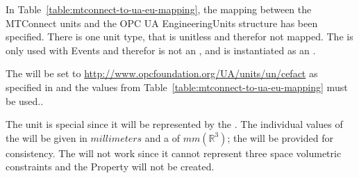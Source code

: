 In Table~\ref{table:mtconnect-to-ua-eu-mapping}, the mapping between the MTConnect units and the OPC UA EngineeringUnits structure has been specified. There is one unit type,  that is unitless and therefor not mapped. The  is only used with \glspl{Event} and therefor is not an , and is instantiated as an .

The  will be set to \url{http://www.opcfoundation.org/UA/units/un/cefact} as specified in \cite{UAPart8} and the values from Table~\ref{table:mtconnect-to-ua-eu-mapping} must be used..

The  unit is special since it will be represented by the . The individual values of the   will be given in $millimeters$ and a  of $mm(\mathbb{R}^{3})$; the  will be provided for consistency. The  will not work since it cannot represent three space volumetric constraints and the  \gls{Property} will not be created.

